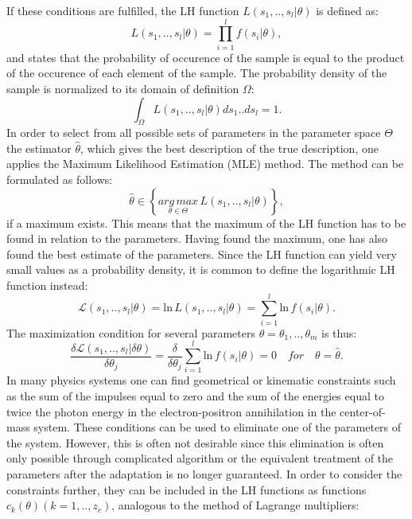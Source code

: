 If these conditions are fulfilled, the LH function $L\left(s_1,..,s_l|\theta \right)$ is defined as:
%
\begin{equation}
  L\left(s_1,..,s_l|\theta \right) = \prod_{i=1}^{l} f(s_i|\theta),
\end{equation}
%
and states that the probability of occurence of the sample is equal to the product of the occurence of each element of the sample. The probability density of the sample is normalized to its domain of definition $\Omega$:
%
\begin{equation}
  \int_{\Omega} L\left(s_1,..,s_l|\theta \right) ds_1 .. ds_l = 1.
\end{equation}
%
In order to select from all possible sets of parameters in the parameter space $\Theta$ the estimator $\hat{\theta}$, which gives the best description of the true description, one applies the Maximum Likelihood Estimation (MLE) method. The method can be formulated as follows:
%
\begin{equation}
  \hat{\theta} \in \left \{ \underset{\theta \in \Theta}{arg\,max}\,L\left(s_1,..,s_l|\theta \right) \right \},
\end{equation}
%
if a maximum exists. This means that the maximum of the LH function has to be found in relation to the parameters. Having found the maximum, one has also found the best estimate of the parameters. Since the LH function can yield very small values as a probability density, it is common to define the logarithmic LH function instead:
%
\begin{equation}
  \mathscr{L}\left(s_1,..,s_l|\theta \right) = \text{ln}\,L\left(s_1,..,s_l|\theta \right) = \sum_{i=1}^{l} \text{ln}\,f(s_i|\theta).
\end{equation}
%
The maximization condition for several parameters $\theta = \theta_1,..,\theta_m$ is thus:
%
\begin{equation}\label{eq:maximization}
  \frac{\delta \mathscr{L}\left(s_1,..,s_l|\delta\theta \right)}{\delta\theta_j} = \frac{\delta}{\delta\theta_j} \sum_{i=1}^{l} \text{ln}\,f(s_i|\theta) = 0 \quad for \quad \theta = \hat{\theta}.
\end{equation}
%
In many physics systems one can find geometrical or kinematic constraints such as the sum of the impulses equal to zero and the sum of the energies equal to twice the photon energy in the electron-positron annihilation in the center-of-mass system. These conditions can be used to eliminate one of the parameters of the system. However, this is often not desirable since this elimination is often only possible through complicated algorithm or the equivalent treatment of the parameters after the adaptation is no longer guaranteed. In order to consider the constraints further, they can be included in the LH functions as functions $c_{k}(\theta)(k=1,..,z_c)$, analogous to the method of Lagrange multipliers:
